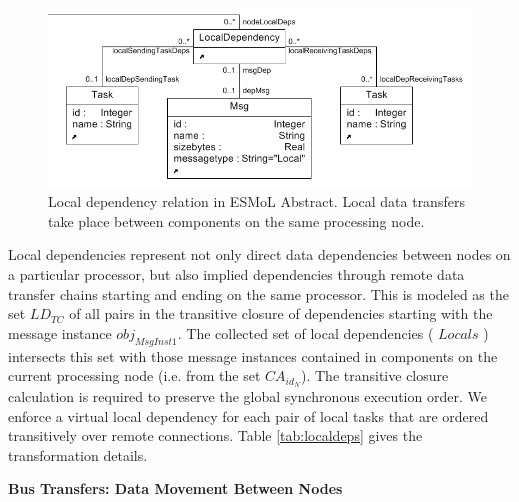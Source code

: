 \begin{figure}
\centering
\includegraphics[width=0.6\columnwidth]{figures/localdeps.png}
    \caption{Local dependency relation in ESMoL Abstract. Local data
transfers take place between components on the same processing node.}
    \label{fig:localdep_meta}
\end{figure}

Local dependencies represent not only direct data dependencies between nodes on
a particular processor, but also implied dependencies through remote data
transfer chains starting and ending on the same processor.   This is modeled as
the set $LD_{TC}$ of all pairs in the transitive closure of dependencies
starting with the message instance $obj_{MsgInst1}$. The collected set of local
dependencies ( $Locals$ ) intersects this set with those message instances
contained in components on the current processing node (i.e. from the set $CA_{id_N}$).  The transitive closure calculation is required to preserve the global
synchronous execution order.  We enforce a virtual local dependency for each 
pair of local tasks that are ordered transitively over remote connections.
Table \ref{tab:localdeps} gives the transformation details.

\textbf{Bus Transfers: Data Movement Between Nodes}

